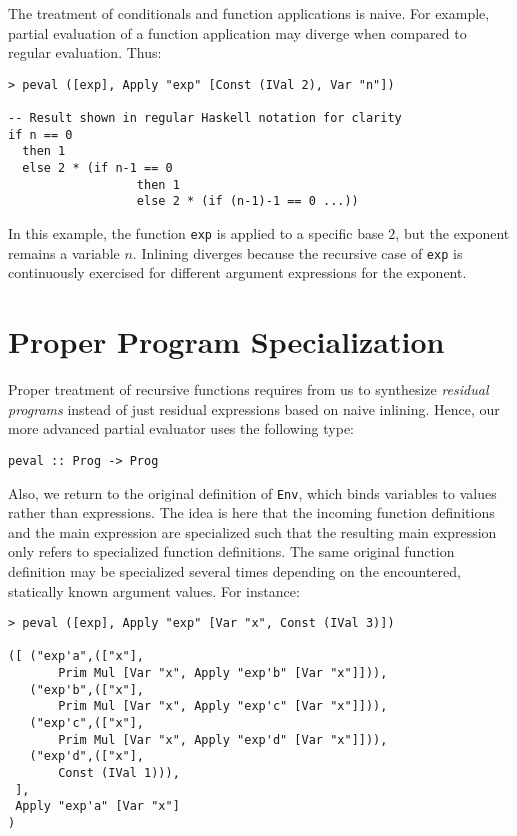 \documentclass{eptcs}
\begin{document}
The treatment of conditionals and function applications is naive. For
example, partial evaluation of a function application may diverge when
compared to regular evaluation. Thus:

\begin{lstlisting}
> peval ([exp], Apply "exp" [Const (IVal 2), Var "n"])

-- Result shown in regular Haskell notation for clarity
if n == 0
  then 1
  else 2 * (if n-1 == 0
                  then 1 
                  else 2 * (if (n-1)-1 == 0 ...))
\end{lstlisting}

\noindent
In this example, the function \lstinline{exp} is applied to a specific
base $2$, but the exponent remains a variable $n$.  Inlining diverges
because the recursive case of \lstinline{exp} is continuously exercised
for different argument expressions for the exponent.


\section{Proper Program Specialization}

Proper treatment of recursive functions requires from us to
synthesize \emph{residual programs} instead of just residual
expressions based on naive inlining. Hence, our more advanced partial
evaluator uses the following type:

\begin{lstlisting}
peval :: Prog -> Prog
\end{lstlisting}

\noindent
Also, we return to the original definition of \lstinline{Env}, which
binds variables to values rather than expressions. The idea is here
that the incoming function definitions and the main expression are
specialized such that the resulting main expression only refers to
specialized function definitions. The same original function
definition may be specialized several times depending on the
encountered, statically known argument values. For instance:

\begin{lstlisting}
> peval ([exp], Apply "exp" [Var "x", Const (IVal 3)])

([ ("exp'a",(["x"],
       Prim Mul [Var "x", Apply "exp'b" [Var "x"]])),
   ("exp'b",(["x"],
       Prim Mul [Var "x", Apply "exp'c" [Var "x"]])),
   ("exp'c",(["x"],
       Prim Mul [Var "x", Apply "exp'd" [Var "x"]])),
   ("exp'd",(["x"],
       Const (IVal 1))), 
 ],
 Apply "exp'a" [Var "x"]
)
\end{lstlisting}
\end{document}

